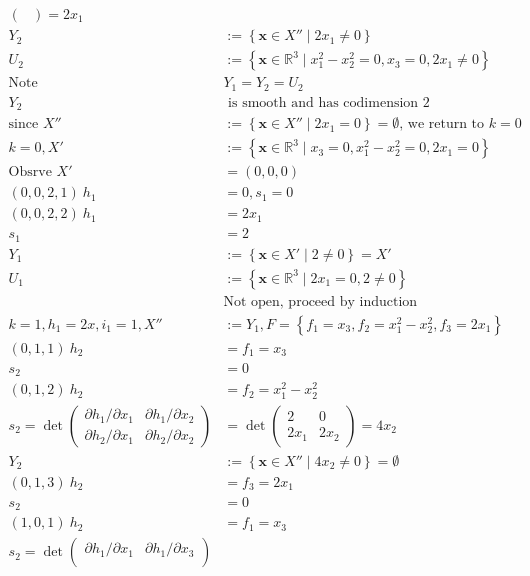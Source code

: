 \documentclass[
]{book}
\theoremstyle{definition}
\theoremstyle{definition}
\theoremstyle{definition}
\theoremstyle{definition}
\theoremstyle{remark}
\begin{document}
\begin{align}
\begin{pmatrix}
\end{pmatrix}=2x_{1}\\Y_{2}&:=\left\{ \mathbf{x}\in X''\mid2x_{1}\ne0\right\}\\U_{2}&:=\left\{ \mathbf{x}\in\mathbb{R}^{3}\mid x_{1}^{2}-x_{2}^{2}=0,x_{3}=0,2x_{1}\ne0\right\} \\\text{Note }&Y_{1}=Y_{2}=U_{2}\\Y_{2}&\text{ is smooth and has codimension }2\\\text{since }X''&:=\left\{ \mathbf{x}\in X''\mid2x_{1}=0\right\} =\emptyset\text{, we return to }k=0\\k=0,X'&:=\left\{ \mathbf{x}\in\mathbb{R}^{3}\mid x_{3}=0,x_{1}^{2}-x_{2}^{2}=0,2x_{1}=0\right\} \\\text{Obsrve }X'&=(0,0,0)\\\left(0,0,2,1\right)\ h_{1}&=0,s_{1}=0\\\left(0,0,2,2\right)\ h_{1}&=2x_{1}\\s_{1}&=2\\Y_{1}&:=\left\{ \mathbf{x}\in X'\mid2\ne0\right\} =X'\\U_{1}&:=\left\{ \mathbf{x}\in\mathbb{R}^{3}\mid2x_{1}=0,2\ne0\right\} \\&\text{Not open, proceed by induction}\\k=1,h_{1}=2x,i_{1}=1,X''&:=Y_{1},F=\left\{ f_{1}=x_{3},f_{2}=x_{1}^{2}-x_{2}^{2},f_{3}=2x_{1}\right\} \\\left(0,1,1\right)\ h_{2}&=f_{1}=x_{3}\\s_{2}&=0\\\left(0,1,2\right)\ h_{2}&=f_{2}=x_{1}^{2}-x_{2}^{2}\\s_{2}=\det\begin{pmatrix}\partial h_{1}/\partial x_{1} & \partial h_{1}/\partial x_{2}\\
\partial h_{2}/\partial x_{1} & \partial h_{2}/\partial x_{2}
\end{pmatrix}&=\det\begin{pmatrix}2 & 0\\
2x_{1} & 2x_{2}
\end{pmatrix}=4x_{2}\\Y_{2}&:=\left\{ \mathbf{x}\in X''\mid4x_{2}\ne0\right\} =\emptyset\\\left(0,1,3\right)\ h_{2}&=f_{3}=2x_{1}\\s_{2}&=0\\\left(1,0,1\right)\ h_{2}&=f_{1}=x_{3}\\s_{2}=\det\begin{pmatrix}\partial h_{1}/\partial x_{1} & \partial h_{1}/\partial x_{3}\\

\end{pmatrix}
\end{align}
\end{document}
